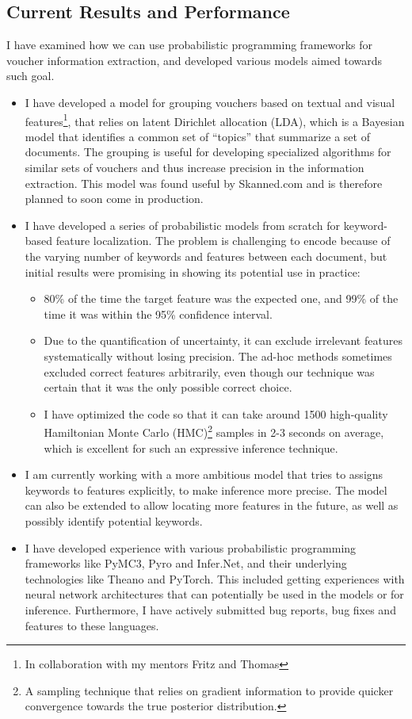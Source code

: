 \documentclass[12pt,a4paper]{article}
\begin{document}
\subsection{Current Results and Performance}
I have examined how we can
use probabilistic programming frameworks for voucher information extraction, and
developed various models aimed towards such goal.
\begin{itemize}
\item I have developed a model for grouping vouchers based on textual and visual
  features\footnote{In collaboration with my mentors Fritz and Thomas},
  that relies on latent Dirichlet allocation (LDA), which is a Bayesian model
  that identifies a common set of ``topics'' that summarize a set of documents. The grouping is useful for developing
  specialized algorithms for similar sets of vouchers and thus increase
  precision in the information extraction. This model was found useful by
  Skanned.com and is therefore planned to soon come in production.
\item I have developed a series of probabilistic models from scratch for
  keyword-based feature localization. The problem is challenging to encode
  because of the varying number of keywords and features between each document,
  but initial results were promising in showing its potential use in practice:
  \begin{itemize}
  \item 80\% of the time the target feature was the expected one, and 99\% of the time
    it was within the 95\% confidence interval.
  \item Due to the quantification of uncertainty, it can exclude irrelevant
    features systematically without losing precision. The ad-hoc methods
    sometimes excluded correct features arbitrarily, even though our technique
    was certain that it was the only possible correct choice.
  \item I have optimized the code so that it can take around 1500 high-quality Hamiltonian Monte Carlo
    (HMC)\footnote{A sampling technique that relies on gradient information to
      provide quicker convergence towards the true posterior distribution.}
    samples in 2-3 seconds on average, which is excellent for such an
    expressive inference technique.
  \end{itemize}
\item I am currently working with a more ambitious model that tries to assigns
  keywords to features explicitly, to make inference more precise. The model can
  also be extended to allow locating more features in the future, as well as possibly identify potential
  keywords.
\item I have developed experience with various probabilistic programming
  frameworks like PyMC3, Pyro and Infer.Net, and their underlying technologies
  like Theano and PyTorch. This included getting experiences with neural network
  architectures that can potentially be used in the models or for inference.
  Furthermore, I have actively submitted bug reports, bug fixes and features to
  these languages.
\end{itemize}
\end{document}
